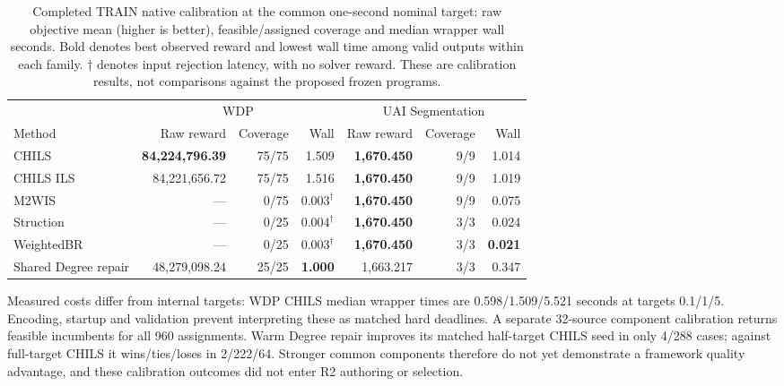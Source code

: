 \begin{table}[t]
\centering
\fontsize{9}{10.4}\selectfont
\setlength{\tabcolsep}{5pt}
\caption{Completed TRAIN native calibration at the common one-second nominal
target: raw objective mean (higher is better), feasible/assigned coverage and
median wrapper wall seconds. Bold denotes best observed reward and lowest
wall time among valid outputs within each family. $\dagger$ denotes input
rejection latency, with no solver reward. These are calibration results,
not comparisons against the proposed frozen programs.}
\label{tab:v06-native}
\begin{tabular}{lrrr rrr}
\toprule
& \multicolumn{3}{c}{WDP} & \multicolumn{3}{c}{UAI Segmentation}\\
Method & Raw reward & Coverage & Wall & Raw reward & Coverage & Wall\\
\midrule
CHILS~\cite{grossmann2025chils} & \textbf{84,224,796.39} & 75/75 & 1.509 & \textbf{1,670.450} & 9/9 & 1.014\\
CHILS ILS~\cite{grossmann2025chils} & 84,221,656.72 & 75/75 & 1.516 & \textbf{1,670.450} & 9/9 & 1.019\\
M2WIS~\cite{grossmann2024mmwis} & --- & 0/75 & $0.003^\dagger$ & \textbf{1,670.450} & 9/9 & 0.075\\
Struction~\cite{gellner2021struction} & --- & 0/25 & $0.004^\dagger$ & \textbf{1,670.450} & 3/3 & 0.024\\
WeightedBR~\cite{lamm2019weighted} & --- & 0/25 & $0.003^\dagger$ & \textbf{1,670.450} & 3/3 & \textbf{0.021}\\
Shared Degree repair & 48,279,098.24 & 25/25 & \textbf{1.000} & 1,663.217 & 3/3 & 0.347\\
\bottomrule
\end{tabular}
\end{table}

Measured costs differ from internal targets: WDP CHILS median wrapper times
are 0.598/1.509/5.521 seconds at targets 0.1/1/5. Encoding, startup and
validation prevent interpreting these as matched hard deadlines. A separate
32-source component calibration returns feasible incumbents for all 960
assignments. Warm Degree repair improves its matched half-target CHILS seed
in only 4/288 cases; against full-target CHILS it wins/ties/loses in
2/222/64. Stronger common components therefore do not yet demonstrate a
framework quality advantage, and these calibration outcomes did not enter
R2 authoring or selection.

